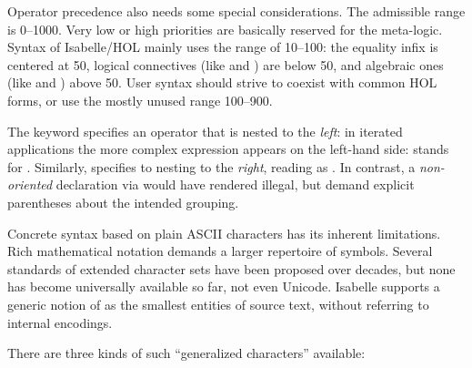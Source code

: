 \begin{isabellebody}
\begin{isamarkuptext}
  Operator precedence also needs some special considerations.  The
  admissible range is 0--1000.  Very low or high priorities are
  basically reserved for the meta-logic.  Syntax of Isabelle/HOL
  mainly uses the range of 10--100: the equality infix \isa{{\isacharequal}} is
  centered at 50, logical connectives (like \isa{{\isasymor}} and \isa{{\isasymand}}) are below 50, and algebraic ones (like \isa{{\isacharplus}} and \isa{{\isacharasterisk}}) above 50.  User syntax should strive to coexist with common
  HOL forms, or use the mostly unused range 100--900.

  \medskip The keyword  specifies an operator that
  is nested to the \emph{left}: in iterated applications the more
  complex expression appears on the left-hand side:  stands for .  Similarly,
   specifies to nesting to the \emph{right},
  reading  as .  In
  contrast, a \emph{non-oriented} declaration via 
  would have rendered  illegal, but demand
  explicit parentheses about the intended grouping.%
\end{isamarkuptext}%
\isamarkuptrue%
%
\isamarkuptrue%
%
\begin{isamarkuptext}%
Concrete syntax based on plain ASCII characters has its inherent
  limitations.  Rich mathematical notation demands a larger repertoire
  of symbols.  Several standards of extended character sets have been
  proposed over decades, but none has become universally available so
  far, not even Unicode.  Isabelle supports a generic
  notion of  as the smallest entities of source text,
  without referring to internal encodings.

  There are three kinds of such ``generalized characters'' available:

  \begin{enumerate}


\end{enumerate}
\end{isamarkuptext}
\end{isabellebody}
